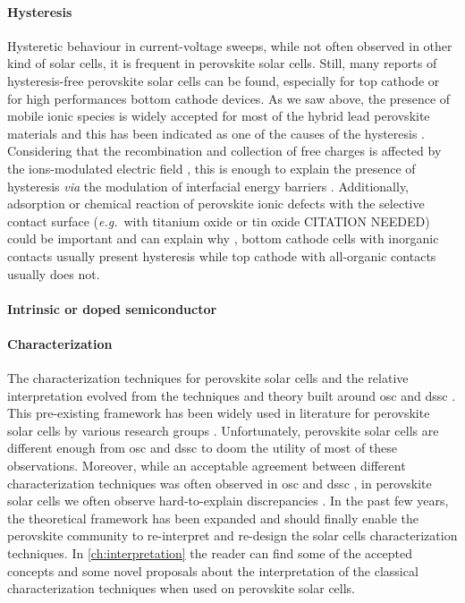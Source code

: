 	\paragraph{Hysteresis}
	Hysteretic behaviour in current-voltage sweeps, while not often observed in other kind of solar cells, it is frequent in perovskite solar cells.
	Still, many reports of hysteresis-free perovskite solar cells can be found, especially for top cathode or for high performances bottom cathode devices.
	As we saw above, the presence of mobile ionic species is widely accepted for most of the hybrid lead perovskite materials and this has been indicated as one of the causes of the hysteresis \cite{Unger2014,Xiao2015}.
	Considering that the recombination and collection of free charges is affected by the ions-modulated electric field \cite{Pockett2017}, this is enough to explain the presence of hysteresis \cite{Tress2015,Calado2016} \textit{via} the modulation of interfacial energy barriers \cite{Moia2019}.
	Additionally, adsorption or chemical reaction of perovskite ionic defects with the selective contact surface (\textit{e.g.}\ with titanium oxide \cite{Yu2016,Beilsten-Edmands2015,Carrillo2016} or tin oxide CITATION NEEDED) could be important and can explain why \cite{Moia2019}, bottom cathode cells with inorganic contacts usually present hysteresis while top cathode with all-organic contacts usually does not.

	\paragraph{Intrinsic or doped semiconductor}


	\paragraph{Characterization}
	The characterization techniques for perovskite solar cells and the relative interpretation evolved from the techniques and theory built around \gls{osc} and \gls{dssc} \cite{Barnes2013}.
	This pre-existing framework has been widely used in literature for perovskite solar cells by various research groups \cite{ORegan2015b,Shao2016,Gelmetti2019,Kiermasch2018,Carnie2015}.
	Unfortunately, perovskite solar cells are different enough from \gls{osc} and \gls{dssc} to doom the utility of most of these observations.
	Moreover, while an acceptable agreement between different characterization techniques was often observed in \gls{osc} \cite{Clarke2015,Maurano2011,Foertig2012} and \gls{dssc} \cite{Barnes2013}, in perovskite solar cells we often observe hard-to-explain discrepancies \cite{Kiermasch2018}.
	In the past few years, the theoretical framework has been expanded and should finally enable the perovskite community to re-interpret and re-design the solar cells characterization techniques.
	In \cref{ch:interpretation} the reader can find some of the accepted concepts and some novel proposals about the interpretation of the classical characterization techniques when used on perovskite solar cells.

